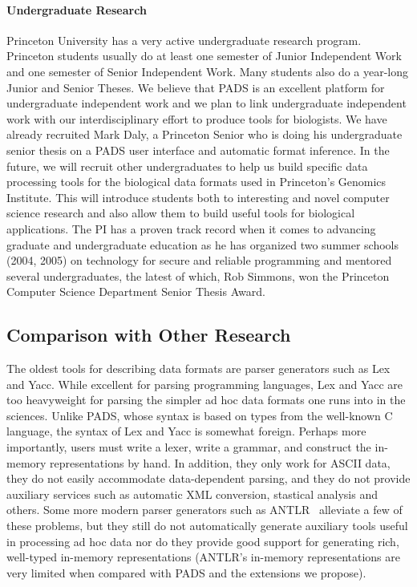 \documentclass[11pt]{article}
\begin{document}
\paragraph*{Undergraduate Research}
Princeton University has a very active undergraduate research program.
Princeton students usually do at least one semester of
Junior Independent Work and one semester of Senior Independent Work. 
Many students also do a year-long
Junior and Senior Theses.  We believe that PADS is an excellent
platform for undergraduate independent work and we plan to link
undergraduate independent work with our interdisciplinary effort to
produce tools for biologists.  We have already recruited Mark Daly,
a Princeton Senior who is doing his undergraduate senior thesis
on a PADS user interface and automatic format inference.
In the future, we will recruit other undergraduates to help us build
specific data processing tools for the biological data formats
used in Princeton's Genomics Institute.
This will introduce students both to interesting and novel
computer science research and also allow them to build useful
tools for biological applications. The PI has a proven track record
when it comes to advancing graduate and undergraduate education
as he has organized two summer schools (2004, 2005) on technology for
secure and reliable programming and mentored several undergraduates,
the latest of which, Rob Simmons, won the Princeton Computer Science Department
Senior Thesis Award.

\subsection{Comparison with Other Research}
\label{ssec:related}

The oldest tools for describing data formats are parser generators such as
Lex and Yacc.  While excellent for parsing programming languages, Lex and Yacc
are too heavyweight for parsing the simpler ad hoc data formats one
runs into in the sciences.   
Unlike PADS, whose syntax is based on types from the well-known C language,
the syntax of Lex and Yacc is somewhat foreign.  Perhaps more importantly,
users must write a lexer, write a
grammar, and construct the in-memory representations by hand.  In
addition, they only work for ASCII data, they do not easily
accommodate data-dependent parsing, and they do not provide auxiliary
services such as automatic XML conversion, stastical analysis and
others.  Some more modern parser generators such as ANTLR~\cite{antlr} alleviate
a few of these problems, but they still do not automatically generate auxiliary tools
useful in processing ad hoc data nor do they provide good support for generating
rich, well-typed in-memory representations (ANTLR's in-memory representations
are very limited when compared with PADS and the extensions we propose).
\end{document}
